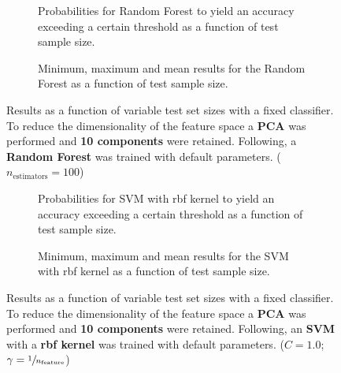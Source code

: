 \begin{figure}
    \captionsetup[subfigure]{justification=justified,singlelinecheck=false}
    \begin{subfigure}[t]{0.61\textwidth}
        
        \caption{Probabilities for Random Forest to yield an accuracy exceeding a certain threshold as a function of test sample size.}
    \end{subfigure}
    \hspace{3.0mm}
    \begin{subfigure}[t]{0.34\textwidth}
        
        \caption{Minimum, maximum and mean results for the Random Forest as a function of test sample size.}
    \end{subfigure}
    \caption[Effects of varying test sample size. Random Forest; Preprocessing: PCA ($n_\text{components} = \num{10}$)]{Results as a function of variable test set sizes with a fixed classifier. To reduce the dimensionality of the feature space a \textbf{PCA} was performed and \textbf{\num{10} components} were retained. Following, a \textbf{{Random Forest}} was trained with default parameters. ($n_\text{estimators}=\num{100}$)}
    \label{fig:PCA_10_components_no_selection_RandomForest}
\end{figure}

\begin{figure}
    \captionsetup[subfigure]{justification=justified,singlelinecheck=false}
    \begin{subfigure}[t]{0.61\textwidth}
        
        \caption{Probabilities for SVM with rbf kernel to yield an accuracy exceeding a certain threshold as a function of test sample size.}
    \end{subfigure}
    \hspace{3.0mm}
    \begin{subfigure}[t]{0.34\textwidth}
        
        \caption{Minimum, maximum and mean results for the SVM with rbf kernel as a function of test sample size.}
    \end{subfigure}
    \caption[Effects of varying test sample size. SVM (kernel = rbf); Preprocessing: PCA ($n_\text{components} = \num{10}$)]{Results as a function of variable test set sizes with a fixed classifier. To reduce the dimensionality of the feature space a \textbf{PCA} was performed and \textbf{\num{10} components} were retained. Following, an \textbf{{SVM}} with a \textbf{{rbf kernel}} was trained with default parameters. ($C=\num{1.0}$; $\gamma=\sfrac{1}{n_\text{feature}}$)}
    \label{fig:PCA_10_components_no_selection_SVC}
\end{figure}

